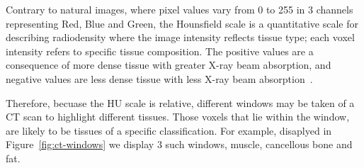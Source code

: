 \documentclass[12pt,twoside]{report}
\begin{document}
Contrary to natural images, where pixel values vary from 0 to 255 in 3 channels representing Red, Blue and Green, the Hounsfield scale is a quantitative scale for describing radiodensity where the image intensity reflects tissue type; each voxel intensity refers to specific tissue composition. The positive values are a consequence of more dense tissue with greater X-ray beam absorption, and negative values are less dense tissue with less X-ray beam absorption~\cite{Statpearls}.  

Therefore, becuase the HU scale is relative, different windows may be taken of a CT scan to highlight different tissues. Those voxels that lie within the window, are likely to be tissues of a specific classification. For example, disaplyed in Figure~\ref{fig:ct-windows} we display 3 such windows, muscle, cancellous bone and fat.






\end{document}

